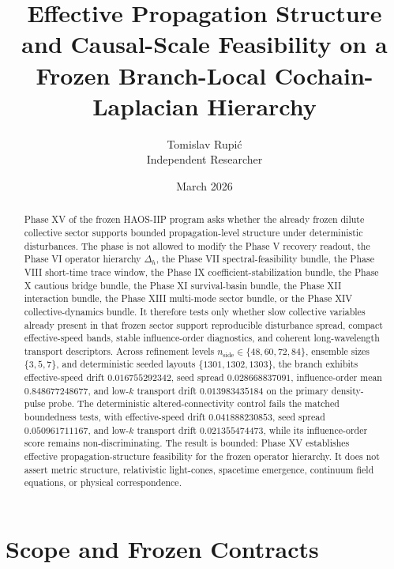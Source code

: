 \documentclass[11pt]{article}
\title{Effective Propagation Structure and Causal-Scale Feasibility on a Frozen Branch-Local Cochain-Laplacian Hierarchy}
\author{Tomislav Rupi\'c \\ Independent Researcher}
\date{March 2026}
\begin{document}
\maketitle

\begin{abstract}
Phase XV of the frozen HAOS-IIP program asks whether the already frozen dilute collective sector supports bounded propagation-level structure under deterministic disturbances. The phase is not allowed to modify the Phase V recovery readout, the Phase VI operator hierarchy $\Delta_h$, the Phase VII spectral-feasibility bundle, the Phase VIII short-time trace window, the Phase IX coefficient-stabilization bundle, the Phase X cautious bridge bundle, the Phase XI survival-basin bundle, the Phase XII interaction bundle, the Phase XIII multi-mode sector bundle, or the Phase XIV collective-dynamics bundle. It therefore tests only whether slow collective variables already present in that frozen sector support reproducible disturbance spread, compact effective-speed bands, stable influence-order diagnostics, and coherent long-wavelength transport descriptors. Across refinement levels $n_{\mathrm{side}}\in\{48,60,72,84\}$, ensemble sizes $\{3,5,7\}$, and deterministic seeded layouts $\{1301,1302,1303\}$, the branch exhibits effective-speed drift $0.016755292342$, seed spread $0.028668837091$, influence-order mean $0.848677248677$, and low-$k$ transport drift $0.013983435184$ on the primary density-pulse probe. The deterministic altered-connectivity control fails the matched boundedness tests, with effective-speed drift $0.041888230853$, seed spread $0.050961711167$, and low-$k$ transport drift $0.021355474473$, while its influence-order score remains non-discriminating. The result is bounded: Phase XV establishes effective propagation-structure feasibility for the frozen operator hierarchy. It does not assert metric structure, relativistic light-cones, spacetime emergence, continuum field equations, or physical correspondence.
\end{abstract}

\section{Scope and Frozen Contracts}
\end{document}
